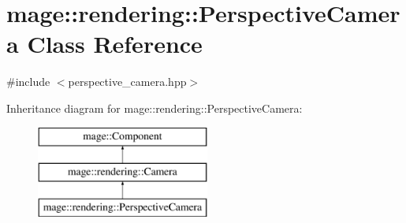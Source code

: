 \hypertarget{classmage_1_1rendering_1_1_perspective_camera}{}\section{mage\+:\+:rendering\+:\+:Perspective\+Camera Class Reference}
\label{classmage_1_1rendering_1_1_perspective_camera}


{\ttfamily \#include $<$perspective\+\_\+camera.\+hpp$>$}

Inheritance diagram for mage\+:\+:rendering\+:\+:Perspective\+Camera\+:\begin{figure}[H]
\begin{center}
\leavevmode
\includegraphics[height=3.000000cm]{classmage_1_1rendering_1_1_perspective_camera}
\end{center}
\end{figure}
